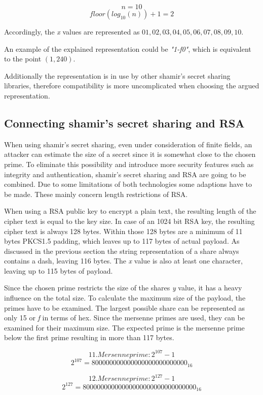 $$n = 10$$
$$floor(log_{10}(n))+1 = 2$$

Accordingly, the \textit{x} values are represented as $01, 02, 03, 04, 05, 06,
07, 08, 09, 10$.

An example of the explained representation could be \textit{"1-f0"}, which is
equivalent to the point $(1, 240)$.

Additionally the representation is in use by other shamir's secret sharing
libraries, therefore compatibility is more uncomplicated when choosing the
argued representation.

\subsection{Connecting shamir's secret sharing and RSA}

When using shamir's secret sharing, even under consideration of finite fields,
an attacker can estimate the size of a secret since it is somewhat close to the
chosen prime. To eliminate this possibility and introduce more security
features such as integrity and authentication, shamir's secret sharing and RSA
are going to be combined. Due to some limitations of both technologies some
adaptions have to be made. These mainly concern length restrictions of RSA.

When using a RSA public key to encrypt a plain text, the resulting length of
the cipher text is equal to the key size. In case of an 1024 bit RSA key, the
resulting cipher text is always 128 bytes. Within those 128 bytes are a minimum
of 11 bytes PKCS1.5 padding, which leaves up to 117 bytes of actual payload. As
discussed in the previous section the string representation of a share always
contains a dash, leaving 116 bytes. The \textit{x} value is also at least one
character, leaving up to 115 bytes of payload.

Since the chosen prime restricts the size of the shares \textit{y} value, it
has a heavy influence on the total size. To calculate the maximum size of the
payload, the primes have to be examined. The largest possible share can be
represented as only 15 or \textit{f} in terms of hex. Since the mersenne primes
are used, they can be examined for their maximum size. The expected prime is
the mersenne prime below the first prime resulting in more than 117 bytes.

$$11. Mersenne prime: 2^{107}-1$$
$$2^{107} = 800000000000000000000000000_{16}$$

$$12. Mersenne prime: 2^{127}-1$$
$$2^{127} = 80000000000000000000000000000000_{16}$$

